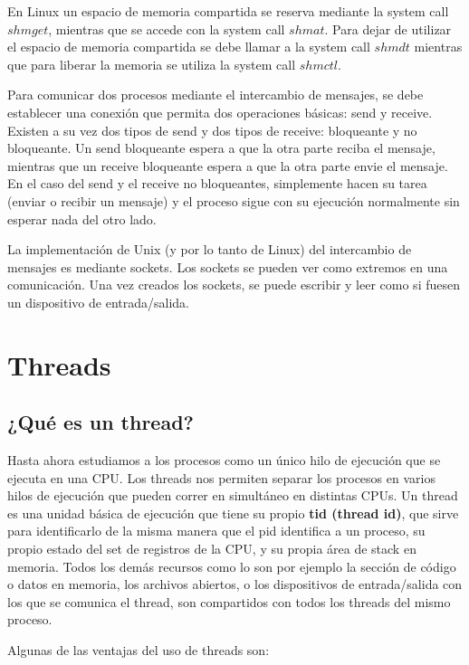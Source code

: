 \documentclass{article}
\begin{document}
En Linux un espacio de memoria compartida se reserva mediante la system call $shmget$, mientras que se accede con la system call $shmat$. Para dejar de utilizar el espacio de memoria compartida se debe llamar a la system call $shmdt$ mientras que para liberar la memoria se utiliza la system call $shmctl$.

Para comunicar dos procesos mediante el intercambio de mensajes, se debe establecer una conexi\'on que permita dos operaciones b\'asicas: send y receive. Existen a su vez dos tipos de send y dos tipos de receive: bloqueante y no bloqueante. Un send bloqueante espera a que la otra parte reciba el mensaje, mientras que un receive bloqueante espera a que la otra parte envie el mensaje. En el caso del send y el receive no bloqueantes, simplemente hacen su tarea (enviar o recibir un mensaje) y el proceso sigue con su ejecuci\'on normalmente sin esperar nada del otro lado.

La implementaci\'on de Unix (y por lo tanto de Linux) del intercambio de mensajes es mediante sockets. Los sockets se pueden ver como extremos en una comunicaci\'on. Una vez creados los sockets, se puede escribir y leer como si fuesen un dispositivo de entrada/salida.

\section{Threads}

\subsection{¿Qu\'e es un thread?}

Hasta ahora estudiamos a los procesos como un \'unico hilo de ejecuci\'on que se ejecuta en una CPU. Los threads nos permiten separar los procesos en varios hilos de ejecuci\'on que pueden correr en simult\'aneo en distintas CPUs. Un thread es una unidad b\'asica de ejecuci\'on que tiene su propio \textbf{tid (thread id)}, que sirve para identificarlo de la misma manera que el pid identifica a un proceso, su propio estado del set de registros de la CPU, y su propia \'area de stack en memoria. Todos los dem\'as recursos como lo son por ejemplo la secci\'on de c\'odigo o datos en memoria, los archivos abiertos, o los dispositivos de entrada/salida con los que se comunica el thread, son compartidos con todos los threads del mismo proceso.

Algunas de las ventajas del uso de threads son:
\end{document}
